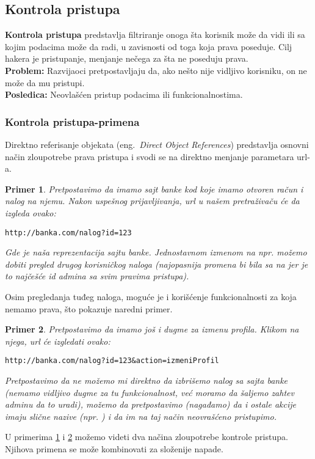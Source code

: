 \documentclass[a4paper]{article}
\newtheorem{primer}{Primer}[section]
\begin{document}
\subsection{Kontrola pristupa}

\textbf{Kontrola pristupa}\cite{AC} predstavlja filtriranje onoga šta korisnik može da vidi ili sa kojim podacima može da radi,  u zavisnosti od toga koja prava poseduje. Cilj hakera je pristupanje, menjanje nečega za šta ne poseduju prava.\\
\textbf{Problem:} Razvijaoci pretpostavljaju da, ako nešto nije vidljivo korisniku, on ne može da mu pristupi.\\
\textbf{Posledica:} Neovlašćen pristup podacima ili funkcionalnostima.

\subsubsection{Kontrola pristupa-primena}

Direktno referisanje objekata (eng.~{\em Direct Object References}) predstavlja osnovni način zloupotrebe prava pristupa i svodi se na direktno menjanje parametara url-a.
\begin{primer}
\label{primer3}
Pretpostavimo da imamo sajt banke kod koje imamo otvoren račun i nalog na njemu. Nakon uspešnog prijavljivanja, url u našem pretraživaču će da izgleda ovako:
\begin{lstlisting}
http://banka.com/nalog?id=123
\end{lstlisting}
Gde je  naša reprezentacija sajtu banke. Jednostavnom izmenom  na npr.  možemo dobiti pregled drugog korisničkog naloga (najopasnija promena bi bila sa  na  jer je to najčešće id admina sa svim pravima pristupa).
\end{primer}
Osim pregledanja tuđeg naloga, moguće je i korišćenje funkcionalnosti za koja nemamo prava, što pokazuje naredni primer.
\begin{primer}
\label{primer4}
Pretpostavimo da imamo još i dugme za izmenu profila. Klikom na njega, url će izgledati ovako:\\

\begin{lstlisting}
http://banka.com/nalog?id=123&action=izmeniProfil
\end{lstlisting}

Pretpostavimo da ne možemo mi direktno da izbrišemo nalog sa sajta banke (nemamo vidljivo dugme za tu funkcionalnost, već moramo da šaljemo zahtev adminu da to uradi), možemo da pretpostavimo (nagađamo) da i ostale akcije imaju slične nazive (npr. ) i da im na taj način neovrašćeno pristupimo.\\
\end{primer}
U primerima \ref{primer3} i \ref{primer4} možemo videti dva načina zloupotrebe kontrole pristupa. Njihova primena se može kombinovati za složenije napade.
\end{document}
